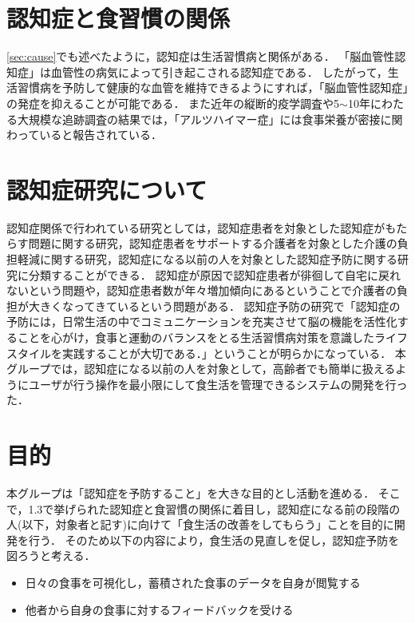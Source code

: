 \documentclass[../report]{subfiles}
\begin{document}
\section{認知症と食習慣の関係}
\ref{sec:cause}でも述べたように，認知症は生活習慣病と関係がある．
「脳血管性認知症」は血管性の病気によって引き起こされる認知症である．
したがって，生活習慣病を予防して健康的な血管を維持できるようにすれば，「脳血管性認知症」の発症を抑えることが可能である．
また近年の縦断的疫学調査や5$\sim$10年にわたる大規模な追跡調査の結果では，「アルツハイマー症」には食事栄養が密接に関わっていると報告されている\cite{nutrition-dementia-00}\cite{nutrition-dementia-01}．


\section{認知症研究について}
認知症関係で行われている研究としては，認知症患者を対象とした認知症がもたらす問題に関する研究，認知症患者をサポートする介護者を対象とした介護の負担軽減に関する研究，認知症になる以前の人を対象とした認知症予防に関する研究に分類することができる．
認知症が原因で認知症患者が徘徊して自宅に戻れないという問題や，認知症患者数が年々増加傾向にあるということで介護者の負担が大きくなってきているという問題がある．
認知症予防の研究で「認知症の予防には，日常生活の中でコミュニケーションを充実させて脳の機能を活性化することを心がけ，食事と運動のバランスをとる生活習慣病対策を意識したライフスタイルを実践することが大切である．」\cite{dementia-prevention}ということが明らかになっている．
本グループでは，認知症になる以前の人を対象として，高齢者でも簡単に扱えるようにユーザが行う操作を最小限にして食生活を管理できるシステムの開発を行った．


\section{目的} \label{sec:objective}
本グループは「認知症を予防すること」を大きな目的とし活動を進める．
そこで，1.3で挙げられた認知症と食習慣の関係に着目し，認知症になる前の段階の人(以下，対象者と記す)に向けて「食生活の改善をしてもらう」ことを目的に開発を行う．
そのため以下の内容により，食生活の見直しを促し，認知症予防を図ろうと考える．

\begin{itemize}
    \item 日々の食事を可視化し，蓄積された食事のデータを自身が閲覧する
    \item 他者から自身の食事に対するフィードバックを受ける
\end{itemize}
\end{document}
